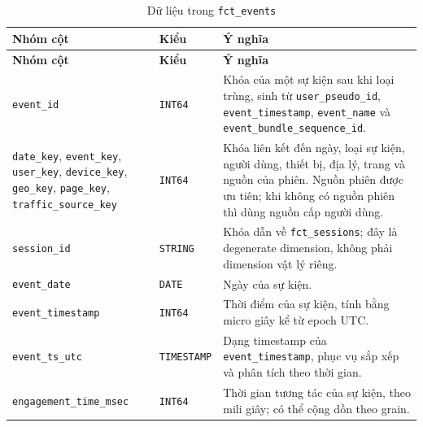 \begin{xltabular}{\textwidth}{>{\raggedright\arraybackslash}p{4.4cm} >{\raggedright\arraybackslash}p{2.2cm} >{\raggedright\arraybackslash}X}
\caption{Dữ liệu trong \texttt{fct\_events}}
\label{tab:fct-events-detail} \\
\hline
\textbf{Nhóm cột} & \textbf{Kiểu} & \textbf{Ý nghĩa} \\
\hline
\endfirsthead
\hline
\textbf{Nhóm cột} & \textbf{Kiểu} & \textbf{Ý nghĩa} \\
\hline
\endhead
\hline
\endfoot
\hline
\endlastfoot

\texttt{event\_id}
& \texttt{INT64}
& Khóa của một sự kiện sau khi loại trùng, sinh từ \texttt{user\_pseudo\_id}, \texttt{event\_timestamp}, \texttt{event\_name} và \texttt{event\_bundle\_sequence\_id}. \\

\texttt{date\_key}, \texttt{event\_key}, \texttt{user\_key}, \texttt{device\_key}, \texttt{geo\_key}, \texttt{page\_key}, \texttt{traffic\_source\_key}
& \texttt{INT64}
& Khóa liên kết đến ngày, loại sự kiện, người dùng, thiết bị, địa lý, trang và nguồn của phiên. Nguồn phiên được ưu tiên; khi không có nguồn phiên thì dùng nguồn cấp người dùng. \\

\texttt{session\_id}
& \texttt{STRING}
& Khóa dẫn về \texttt{fct\_sessions}; đây là degenerate dimension, không phải dimension vật lý riêng. \\

\texttt{event\_date}
& \texttt{DATE}
& Ngày của sự kiện. \\

\texttt{event\_timestamp}
& \texttt{INT64}
& Thời điểm của sự kiện, tính bằng micro giây kể từ epoch UTC. \\

\texttt{event\_ts\_utc}
& \texttt{TIMESTAMP}
& Dạng timestamp của \texttt{event\_timestamp}, phục vụ sắp xếp và phân tích theo thời gian. \\

\texttt{engagement\_time\_msec}
& \texttt{INT64}
& Thời gian tương tác của sự kiện, theo mili giây; có thể cộng dồn theo grain. \\
\end{xltabular}

